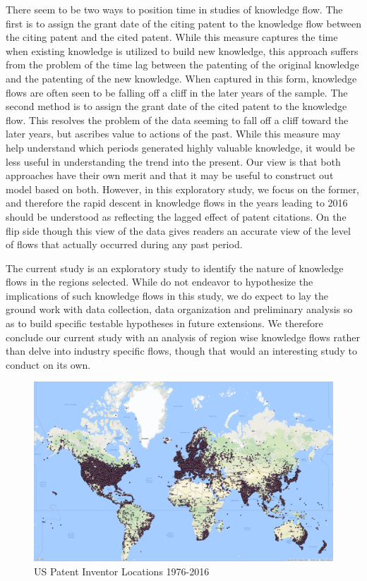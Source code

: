 \documentclass[12pt]{article}
\begin{document}
There seem to be two ways to position time in studies of knowledge flow. The first is to assign the grant date of the citing patent to the knowledge flow between the citing patent and the cited patent. While this measure captures the time when existing knowledge is utilized to build new knowledge, this approach suffers from the problem of the time lag between the patenting of the original knowledge and the patenting  of the new knowledge. When captured in this form, knowledge flows are often seen to be falling off a cliff in the later years of the sample. The second method is to assign the grant date of the cited patent to the knowledge flow. This resolves the problem of the data seeming to fall off a cliff toward the later years, but ascribes value to actions of the past. While this measure may help understand which periods generated highly valuable knowledge, it would be less useful in understanding the trend into the present. Our view is that both approaches have their own merit and that it may be useful to construct out model based on both. However, in this exploratory study, we focus on the former, and therefore the rapid descent in knowledge flows in the years leading to 2016 should be understood as reflecting the lagged effect of patent citations. On the flip side though this view of the data gives readers an accurate view of the level of flows that actually occurred during any past period.

The current study is an exploratory study to identify the nature of knowledge flows in the regions selected. While do not endeavor to hypothesize the implications of such knowledge flows in this study, we do expect to lay the ground work with data collection, data organization and preliminary analysis so as to build specific testable hypotheses in future extensions. We therefore conclude our current study with an analysis of region wise knowledge flows rather than delve into industry specific flows, though that would an interesting study to conduct on its own.

\begin{figure}[h]
\begin{centering}
  \includegraphics[scale=0.2]{PatentLocations}
  \caption{US Patent Inventor Locations 1976-2016}
  \label{fig:patentlocations}
\end{centering}
\end{figure}
\end{document}
